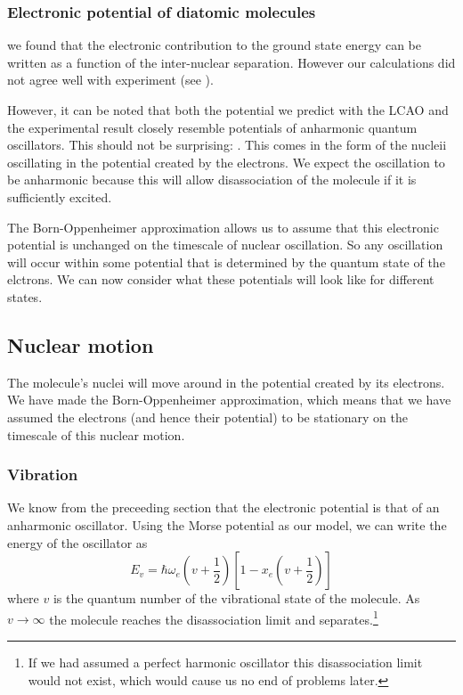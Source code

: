 \subsubsection{Electronic potential of diatomic molecules}

 we found that the electronic contribution to the ground state energy
can be written as a function of the inter-nuclear separation. However our
calculations did not agree well with experiment (see
).

However, it can be noted that both the potential we predict with the LCAO and
the experimental result closely resemble potentials of anharmonic quantum
oscillators. This should not be surprising: . This comes in the form of the
nucleii oscillating in the potential created by the electrons.  We expect the oscillation to be anharmonic
because this will allow disassociation of the molecule if it is sufficiently
excited.

The Born-Oppenheimer approximation allows us to assume that this electronic
potential is unchanged on the timescale of nuclear oscillation. So any
oscillation will occur within some potential that is determined by the quantum
state of the elctrons. We can now consider what these potentials will look like
for different states.

%

\subsection{Nuclear motion}

The molecule's nuclei will move around in the potential created by its
electrons. We have made the Born-Oppenheimer approximation, which means that we
have assumed the electrons (and hence their potential) to be stationary on the
timescale of this nuclear motion.

\subsubsection{Vibration}

We know from the preceeding section that the electronic potential is that of an
anharmonic oscillator. Using the Morse potential  as our model, we
can write the energy of the oscillator as
%
\begin{equation}
  E_v = \hbar \omega_e (v + \frac{1}{2})[1 - x_e(v+\frac{1}{2})]
\end{equation}
%
 where $v$ is the quantum number of the
vibrational state of the molecule. As $v \rightarrow \infty $ the molecule
reaches the disassociation limit and separates.\footnote{If we had assumed a
perfect harmonic oscillator this disassociation limit would not exist, which
would cause us no end of problems later.}

